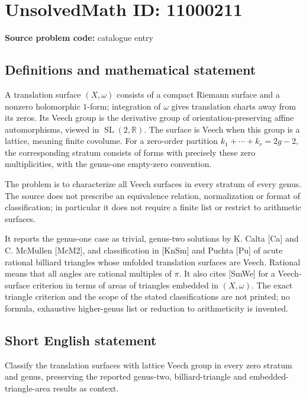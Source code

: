 \documentclass[11pt]{article}
\newcommand{\R}{\mathbb{R}}
\begin{document}
\section*{UnsolvedMath ID: 11000211}
\textbf{Source problem code:} catalogue entry
\subsection{Definitions and mathematical statement}
A translation surface \((X,\omega)\) consists of a compact Riemann surface and a nonzero holomorphic \(1\)-form; integration of \(\omega\) gives translation charts away from its zeros. Its Veech group is the derivative group of orientation-preserving affine automorphisms, viewed in \(\operatorname{SL}(2,\R)\). The surface is Veech when this group is a lattice, meaning finite covolume. For a zero-order partition \(k_1+\cdots+k_r=2g-2\), the corresponding stratum consists of forms with precisely these zero multiplicities, with the genus-one empty-zero convention.

The problem is to characterize all Veech surfaces in every stratum of every genus. The source does not prescribe an equivalence relation, normalization or format of classification; in particular it does not require a finite list or restrict to arithmetic surfaces.

It reports the genus-one case as trivial, genus-two solutions by K. Calta [Ca] and C. McMullen [McM2], and classification in [KnSm] and Puchta [Pu] of acute rational billiard triangles whose unfolded translation surfaces are Veech. Rational means that all angles are rational multiples of \(\pi\). It also cites [SmWe] for a Veech-surface criterion in terms of areas of triangles embedded in \((X,\omega)\). The exact triangle criterion and the scope of the stated classifications are not printed; no formula, exhaustive higher-genus list or reduction to arithmeticity is invented.
\subsection{Short English statement}
Classify the translation surfaces with lattice Veech group in every zero stratum and genus, preserving the reported genus-two, billiard-triangle and embedded-triangle-area results as context.
\end{document}
